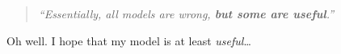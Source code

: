 
\begin{preamble}
    \thispagestyle{empty}
    \large
    \begin{quote}
        \emph{``Essentially, all models are wrong, \textbf{but some are useful}.''}
        \vspace*{4mm}
    \end{quote}
    
    Oh well. I hope that my model is at least \emph{useful}\ldots
\end{preamble}